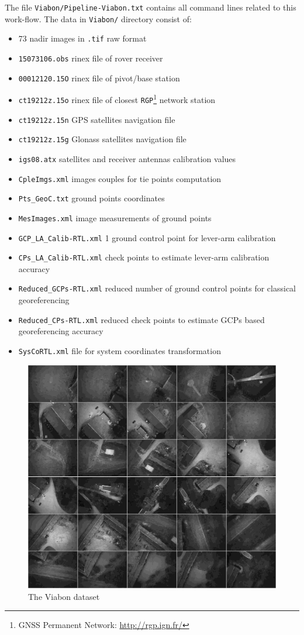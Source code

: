 The file {\tt Viabon/Pipeline-Viabon.txt} contains all command lines related to this work-flow. The data in {\tt Viabon/} directory consist of:
\newline
\begin{itemize}
\item 73 nadir images in {\tt .tif} raw format
\item {\tt 15073106.obs} rinex file of rover receiver
\item {\tt 00012120.15O} rinex file of pivot/base station
\item {\tt ct19212z.15o} rinex file of closest {\tt RGP}\footnote{GNSS Permanent Network: \url{http://rgp.ign.fr/}} network station
\item {\tt ct19212z.15n} GPS satellites navigation file
\item {\tt ct19212z.15g} Glonass satellites navigation file
\item {\tt igs08.atx} satellites and receiver antennas calibration values
\item {\tt CpleImgs.xml} images couples for tie points computation
\item {\tt Pts\_GeoC.txt} ground points coordinates
\item {\tt MesImages.xml} image measurements of ground points
\item {\tt GCP\_LA\_Calib-RTL.xml} 1 ground control point for lever-arm calibration 
\item {\tt CPs\_LA\_Calib-RTL.xml} check points to estimate lever-arm calibration accuracy
\item {\tt Reduced\_GCPs-RTL.xml} reduced number of ground control points for classical georeferencing
\item {\tt Reduced\_CPs-RTL.xml} reduced check points to estimate GCPs based georeferencing accuracy
\item {\tt SysCoRTL.xml} file for system coordinates transformation 
\end{itemize}

\begin{figure}[H]
    \begin{center}
    \setlength{\unitlength}{0.5cm}
    \includegraphics[width=0.5\linewidth]{FIGS/Viabon/panel.jpg}
    \end{center}
    \caption{The Viabon dataset}
    \label{fig:iris}
\end{figure}

